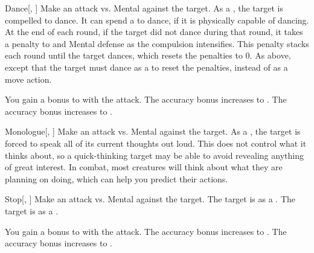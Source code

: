 \lowercase{\hypertarget{spell:Dance}{}}\label{spell:Dance}
\begin{freeability}[Rank 1]{\hypertarget{spell:Dance}{Dance}}[, ]
Make an attack vs. Mental against the target.
\hit As a , the target is compelled to dance.
It can spend a  to dance, if it is physically capable of dancing.
At the end of each round, if the target did not dance during that round, it takes a  penalty to  and Mental defense as the compulsion intensifies.
This penalty stacks each round until the target dances, which resets the penalties to 0.
\crit As above, except that the target must dance as a  to reset the penalties, instead of as a move action.

\rankline
{} You gain a  bonus to  with the attack.
 The accuracy bonus increases to .
 The accuracy bonus increases to .
\end{freeability}
\vspace{0.25em}



\lowercase{\hypertarget{spell:Monologue}{}}\label{spell:Monologue}
\begin{freeability}[Rank 1]{\hypertarget{spell:Monologue}{Monologue}}[, ]
Make an attack vs. Mental against the target.
\hit As a , the target is forced to speak all of its current thoughts out loud.
This does not control what it thinks about, so a quick-thinking target may be able to avoid revealing anything of great interest.
In combat, most creatures will think about what they are planning on doing, which can help you predict their actions.
\end{freeability}
\vspace{0.25em}



\lowercase{\hypertarget{spell:Stop}{}}\label{spell:Stop}
\begin{freeability}[Rank 1]{\hypertarget{spell:Stop}{Stop}}[, ]
Make an attack vs. Mental against the target.
\hit The target is  as a .
\crit The target is  as a .

\rankline
{} You gain a  bonus to  with the attack.
 The accuracy bonus increases to .
 The accuracy bonus increases to .
\end{freeability}
\vspace{0.25em}



